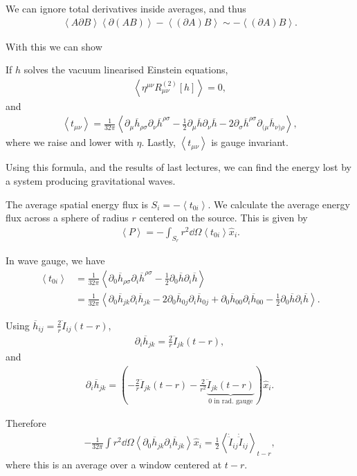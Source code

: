 We can ignore total derivatives inside averages, and thus
\begin{align}
    \left<A \partial B \right> \left<\partial \left( AB \right)  \right> - \left<\left( \partial A \right) B \right> \sim - \left<\left( \partial A \right) B \right>
.\end{align}

With this we can show
\begin{exercise}
    If $h$ solves the vacuum linearised Einstein equations,
    \begin{align}
        \left<\eta^{\mu \nu} R^{\left( 2 \right) }_{\mu \nu}\left[ h \right]  \right> =0
    ,\end{align}
    and 
    \begin{align}
        \left<t_{\mu \nu} \right> = \frac{1}{32\pi} \left<\partial_\mu \overline{h}_{\rho \sigma} \partial_\nu \overline{h}^{\rho \sigma} -\frac{1}{2} \partial_\mu \overline{h} \partial_\nu \overline{h} - 2 \partial_\sigma \overline{h}^{\rho \sigma} \partial_{(\mu} \overline{h}_{\nu)\rho}\right> 
    ,\end{align}
    where we raise and lower with $\eta$. Lastly, $\left<t_{\mu \nu} \right>$ is gauge invariant.
\end{exercise}

Using this formula, and the results of last lectures, we can find the energy lost by a system producing gravitational waves.

The average spatial energy flux is $S_i = - \left<t_{0i} \right>$. We calculate the average energy flux across a sphere of radius $r$ centered on the source. This is given by
\begin{align}
    \left<P \right> = - \int_{S_r} r^2 \dd{\Omega} \left<t_{0i} \right> \hat{x}_i 
.\end{align}

In wave gauge, we have
\begin{align}
    \left<t_{0i} \right> &= \frac{1}{32\pi} \left<\partial_0 \overline{h}_{\rho \sigma} \partial_i \overline{h}^{\rho \sigma} - \frac{1}{2} \partial_0 \overline{h} \partial_i \overline{h} \right> \\
    &= \frac{1}{32\pi} \left<\partial_0 \overline{h}_{jk} \partial_i \overline{h}_{jk} - 2 \partial_0 \overline{h}_{0j} \partial_i \overline{h}_{0j} + \partial_0 \overline{h}_{00} \partial_i \overline{h}_{00} - \frac{1}{2} \partial_0 \overline{h} \partial_i \overline{h} \right> 
.\end{align}

Using $\overline{h}_{ij} =\frac{2}{r} \ddot{I}_{ij}\left( t - r \right) $,
\begin{align}
    \partial_i \overline{h}_{jk} = \frac{2}{r} \dddot{I}_{jk} \left( t - r \right) 
,\end{align}
and
\begin{align}
    \partial_i \overline{h}_{jk} = \left( -\frac{2}{r} \dddot{I}_{jk}\left( t - r \right) - \frac{2}{r^2} \underbrace{\ddot{I}_{jk}\left( t - r \right)}_{\text{0 in rad. gauge}}   \right) \hat{x}_i
.\end{align}

Therefore
\begin{align}
    -\frac{1}{32\pi} \int r^2 \dd{\Omega} \left<\partial_0 \overline{h}_{jk} \partial_i \overline{h}_{jk} \right> \hat{x}_i = \frac{1}{2} \left<\dot{\ddot{I}}_{ij} \dot{\ddot{I}}_{ij} \right>_{t - r}
,\end{align}
where this is an average over a window centered at $t - r$.
